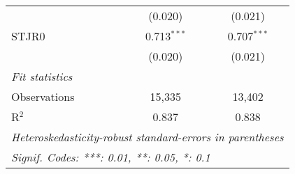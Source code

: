 \begin{tabular}{lcc}
                           & (0.020)        & (0.021)\\   
   STJR0                   & 0.713$^{***}$  & 0.707$^{***}$\\   
                           & (0.020)        & (0.021)\\   
   \midrule
   \emph{Fit statistics}\\
   Observations            & 15,335         & 13,402\\  
   R$^2$                   & 0.837          & 0.838\\  
   \midrule \midrule
   \multicolumn{3}{l}{\emph{Heteroskedasticity-robust standard-errors in parentheses}}\\
   \multicolumn{3}{l}{\emph{Signif. Codes: ***: 0.01, **: 0.05, *: 0.1}}\\
\end{tabular}
\par\endgroup


